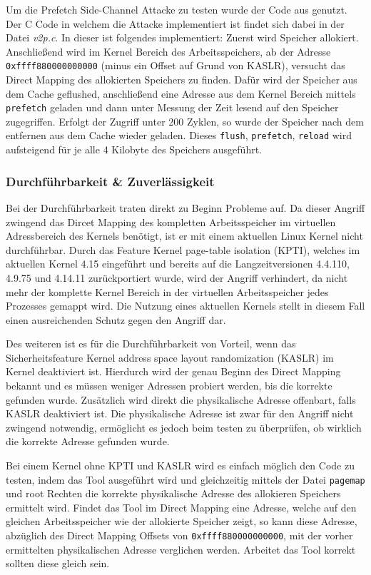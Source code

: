 Um die Prefetch Side-Channel Attacke zu testen wurde der Code aus \cite{git-prefetch} genutzt. Der C Code in welchem die Attacke implementiert ist findet sich dabei in der Datei \emph{v2p.c}. In dieser ist folgendes implementiert:
Zuerst wird Speicher allokiert. Anschließend wird im Kernel Bereich des Arbeitsspeichers, ab der Adresse \texttt{0xffff880000000000} (minus ein Offset auf Grund von KASLR), versucht das Direct Mapping des allokierten Speichers zu finden. Dafür wird der Speicher aus dem Cache geflushed, anschließend eine Adresse aus dem Kernel Bereich mittels \texttt{prefetch} geladen und dann unter Messung der Zeit lesend auf den Speicher zugegriffen. Erfolgt der Zugriff unter 200 Zyklen, so wurde der Speicher nach dem entfernen aus dem Cache wieder geladen. Dieses \texttt{flush}, \texttt{prefetch}, \texttt{reload} wird aufsteigend für je alle 4 Kilobyte des Speichers ausgeführt.
~\\


\subsubsection{Durchführbarkeit \& Zuverlässigkeit}
Bei der Durchführbarkeit traten direkt zu Beginn Probleme auf. Da dieser Angriff zwingend das Dircet Mapping des kompletten Arbeitsspeicher im virtuellen Adressbereich des Kernels benötigt, ist er mit einem aktuellen Linux Kernel nicht durchführbar. Durch das Feature Kernel page-table isolation (KPTI), welches im aktuellen Kernel 4.15 eingeführt und bereits auf die Langzeitversionen 4.4.110, 4.9.75 und 4.14.11 zurückportiert wurde, wird der Angriff verhindert, da nicht mehr der komplette Kernel Bereich in der virtuellen Arbeitsspeicher jedes Prozesses gemappt wird. Die Nutzung eines aktuellen Kernels stellt in diesem Fall einen ausreichenden Schutz gegen den Angriff dar.

Des weiteren ist es für die Durchführbarkeit von Vorteil, wenn das Sicherheitsfeature Kernel address space layout randomization (KASLR) im Kernel deaktiviert ist. Hierdurch wird der genau Beginn des Direct Mapping bekannt und es müssen weniger Adressen probiert werden, bis die korrekte gefunden wurde. Zusätzlich wird direkt die physikalische Adresse offenbart, falls KASLR deaktiviert ist. Die physikalische Adresse ist zwar für den Angriff nicht zwingend notwendig, ermöglicht es jedoch beim testen zu überprüfen, ob wirklich die korrekte Adresse gefunden wurde.

Bei einem Kernel ohne KPTI und KASLR wird es einfach möglich den Code zu testen, indem das Tool ausgeführt wird und gleichzeitig mittels der Datei \texttt{pagemap} und root Rechten die korrekte physikalische Adresse des allokieren Speichers ermittelt wird. Findet das Tool im Direct Mapping eine Adresse, welche auf den gleichen Arbeitsspeicher wie der allokierte Speicher zeigt, so kann diese Adresse, abzüglich des Direct Mapping Offsets von \texttt{0xffff880000000000}, mit der vorher ermittelten physikalischen Adresse verglichen werden. Arbeitet das Tool korrekt sollten diese gleich sein.

